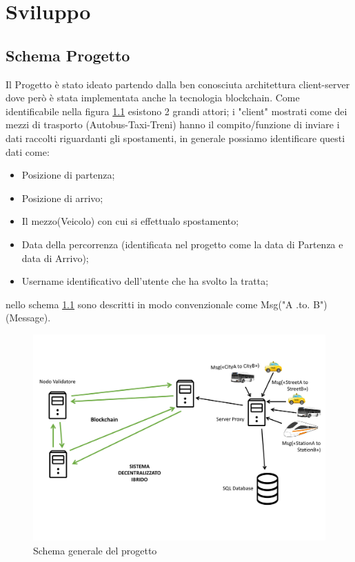 \documentclass[11pt,a4paper,titlepage,twoside,openright]{report}
\begin{document}
\chapter{Sviluppo}
\section{Schema Progetto}\label{Schema-Progetto}
Il Progetto è stato ideato partendo dalla ben conosciuta architettura client-server dove però è stata implementata anche la tecnologia blockchain. Come identificabile nella figura \ref{fig:sch} esistono 2 grandi attori; i "client" mostrati come dei mezzi di trasporto (Autobus-Taxi-Treni) hanno il compito/funzione di inviare i dati raccolti riguardanti gli spostamenti, in generale possiamo identificare questi dati come: 
\begin{itemize}
\item Posizione di partenza;
\item Posizione di arrivo;
\item Il mezzo(Veicolo) con cui si effettualo spostamento;
\item Data della percorrenza (identificata nel progetto come la data di Partenza e data di Arrivo);
\item Username identificativo dell'utente che ha svolto la tratta;
\end{itemize}
nello schema \ref{fig:sch} sono descritti in modo convenzionale come Msg("A .to. B") (Message).
\begin{figure}[h]
	\includegraphics[width=\textwidth]{Schema_Progetto}
	\centering
	\caption{Schema generale del progetto}
	\label{fig:sch}
\end{figure}
\end{document}
